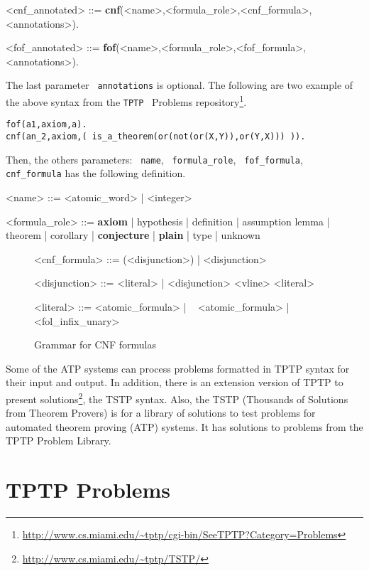 \documentclass[11pt]{article}
\newcommand{\tptp}[0]{\texorpdfstring{\texttt{TPTP}}\ \ }
\newcommand{\ttgray}[1]{\texttt{\color{gray} #1}}
\begin{document}
\label{syntax:fof}
\begin{grammar}
<cnf_annotated> ::= \textbf{cnf}(<name>,<formula_role>,<cnf_formula>,<annotations>).

<fof_annotated> ::= \textbf{fof}(<name>,<formula_role>,<fof_formula>,<annotations>).
\end{grammar}


The last parameter \ttgray{annotations} is optional.
The following are two example of the above syntax from the \tptp
Problems repository\footnote{\url{http://www.cs.miami.edu/~tptp/cgi-bin/SeeTPTP?Category=Problems}}.

\begin{lstlisting}
fof(a1,axiom,a).
cnf(an_2,axiom,( is_a_theorem(or(not(or(X,Y)),or(Y,X))) )).
\end{lstlisting}

Then, the others parameters: \ttgray{name}, \ttgray{formula_role},
\ttgray{fof_formula}, \ttgray{cnf_formula} has the following definition.
\begin{grammar}
<name> ::= <atomic_word> | <integer>

<formula_role> ::= {\bf axiom} | hypothesis | definition | assumption
\alt lemma | theorem | corollary | {\bf conjecture}
 | {\bf plain }| type | unknown
\end{grammar}
\begin{figure}[!ht]
\centering
\label{syntax:cnfformula}
\begin{grammar}
<cnf_formula> ::= (<disjunction>) | <disjunction>

<disjunction> ::= <literal> | <disjunction> <vline> <literal>

<literal> ::= <atomic_formula> | ~ <atomic_formula> | <fol_infix_unary>
\end{grammar}
\caption{Grammar for CNF formulas}
\end{figure}

Some of the ATP systems can process problems formatted
in TPTP syntax for their input and output. In addition, there is an extension
version of TPTP to present solutions\footnote{\url{http://www.cs.miami.edu/~tptp/TSTP/}},
the TSTP syntax. Also, the TSTP (Thousands of Solutions from Theorem Provers) is
for a library of solutions to test problems for automated theorem proving (ATP)
systems. It has solutions to problems from the TPTP Problem Library.\par

\section{TPTP Problems}
\end{document}
